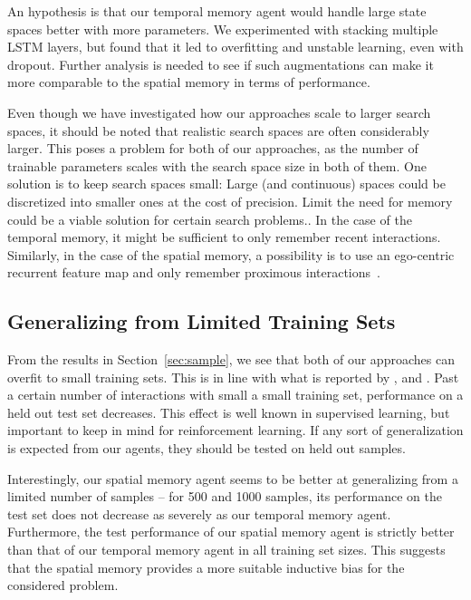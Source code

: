 An hypothesis is that our temporal memory agent would handle large state spaces better with more parameters.
We experimented with stacking multiple LSTM layers, but found that it led to overfitting and unstable learning, even with dropout.
Further analysis is needed to see if such augmentations can make it more comparable to the spatial memory in terms of performance.

Even though we have investigated how our approaches scale to larger search spaces,
it should be noted that realistic search spaces are often considerably larger.
This poses a problem for both of our approaches, as the number of trainable parameters scales with the search space size in both of them.
One solution is to keep search spaces small:
Large (and continuous) spaces could be discretized into smaller ones at the cost of precision.
Limit the need for memory could be a viable solution for certain search problems..
In the case of the temporal memory, it might be sufficient to only remember recent interactions.
Similarly, in the case of the spatial memory, a possibility is to use an ego-centric recurrent feature map and only remember proximous interactions~\cite{parisotto_neural_2017}.

\subsection{Generalizing from Limited Training Sets}

From the results in Section~\ref{sec:sample}, we see that both of our approaches can overfit to small training sets.
This is in line with what is reported by \cite{cobbe_quantifying_2019}, \cite{cobbe_leveraging_2020} and \cite{zhang_study_2018}.
Past a certain number of interactions with small a small training set, performance on a held out test set decreases.
This effect is well known in supervised learning, but important to keep in mind for reinforcement learning.
If any sort of generalization is expected from our agents, they should be tested on held out samples.

Interestingly, our spatial memory agent seems to be better at generalizing from a limited number of samples --
for 500 and 1000 samples, its performance on the test set does not decrease as severely as our temporal memory agent.
Furthermore, the test performance of our spatial memory agent is strictly better than that of our temporal memory agent in all training set sizes.
This suggests that the spatial memory provides a more suitable inductive bias for the considered problem.

